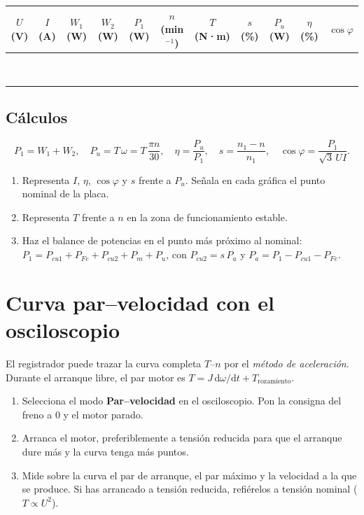 \documentclass[11pt,a4paper]{article}
\begin{document}
\begin{tabularx}{\textwidth}{|C|C|C|C|C|C|C||C|C|C|C|}
  \hline
  $U$ (V) & $I$ (A) & $W_1$ (W) & $W_2$ (W) & $P_1$ (W) & $n$ (min$^{-1}$) & $T$ (N·m) & $s$ (\%) & $P_u$ (W) & $\eta$ (\%) & $\cos\varphi$ \\ \hline
   & & & & & & & & & & \\[5pt] \hline
   & & & & & & & & & & \\[5pt] \hline
   & & & & & & & & & & \\[5pt] \hline
   & & & & & & & & & & \\[5pt] \hline
   & & & & & & & & & & \\[5pt] \hline
   & & & & & & & & & & \\[5pt] \hline
   & & & & & & & & & & \\[5pt] \hline
   & & & & & & & & & & \\[5pt] \hline
   & & & & & & & & & & \\[5pt] \hline
\end{tabularx}

\subsection*{Cálculos}
\[
  P_1 = W_1 + W_2,\quad P_u = T\,\omega = T\,\frac{\pi n}{30},\quad \eta = \frac{P_u}{P_1},\quad s = \frac{n_1 - n}{n_1},\quad \cos\varphi = \frac{P_1}{\sqrt3\,U I}.
\]
\begin{enumerate}
  \item Representa $I$, $\eta$, $\cos\varphi$ y $s$ frente a $P_u$. Señala en cada gráfica el punto nominal de la placa.
  \item Representa $T$ frente a $n$ en la zona de funcionamiento estable.
  \item Haz el balance de potencias en el punto más próximo al nominal: $P_1 = P_{cu1} + P_{Fe} + P_{cu2} + P_m + P_u$, con $P_{cu2} = s\,P_a$ y $P_a = P_1 - P_{cu1} - P_{Fe}$.
\end{enumerate}

\section{Curva par–velocidad con el osciloscopio}
El registrador puede trazar la curva completa $T$–$n$ por el \emph{método de aceleración}. Durante el arranque libre, el par motor es $T = J\,\mathrm{d}\omega/\mathrm{d}t + T_\text{rozamiento}$.
\begin{enumerate}
  \item Selecciona el modo \textbf{Par–velocidad} en el osciloscopio. Pon la consigna del freno a 0 y el motor parado.
  \item Arranca el motor, preferiblemente a tensión reducida para que el arranque dure más y la curva tenga más puntos.
  \item Mide sobre la curva el par de arranque, el par máximo y la velocidad a la que se produce. Si has arrancado a tensión reducida, refiérelos a tensión nominal ($T \propto U^2$).
\end{enumerate}
\end{document}
